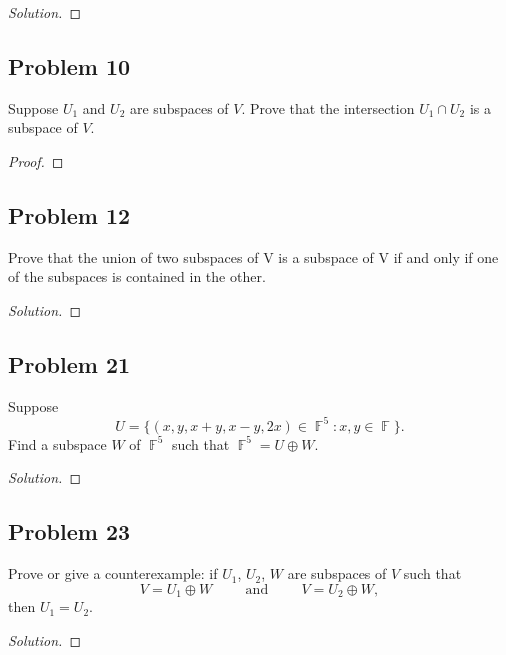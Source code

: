 \documentclass[letterpaper, 12pt]{amsart}
\DeclareMathOperator{\F}{\mathbb{F}}
\theoremstyle{definition}  %
\begin{document}
		\begin{proof}[Solution]
		\end{proof}	

		\subsection*{Problem 10}
		Suppose $U_{1}$ and $U_{2}$ are subspaces of $V$. 
		Prove that the intersection $U_{1} \cap U_{2}$ is a subspace of $V$.

		\begin{proof}
		\end{proof}

		\subsection*{Problem 12}
		Prove that the union of two subspaces of V is a subspace of V if and only if one of the subspaces is contained in the other.

		\begin{proof}[Solution]
		\end{proof}		

		\subsection*{Problem 21}
		Suppose $$U = \{ (x,y,x+y,x-y,2x) \in \F^{5} : x, y \in \F \}.$$ 
		Find a subspace $W$ of $\F^{5}$ such that $\F^{5} = U \oplus W$.

		\begin{proof}[Solution]
		\end{proof}

		\subsection*{Problem 23}
		Prove or give a counterexample: if $U_{1}$, $U_{2}$, $W$ are subspaces of $V$ such that	$$V = U_{1} \oplus W \hspace{1cm} \text{and} \hspace{1cm} V = U_{2} \oplus W,$$ then $U_{1} = U_{2}$. 

		\begin{proof}[Solution]
		\end{proof}
\end{document}
